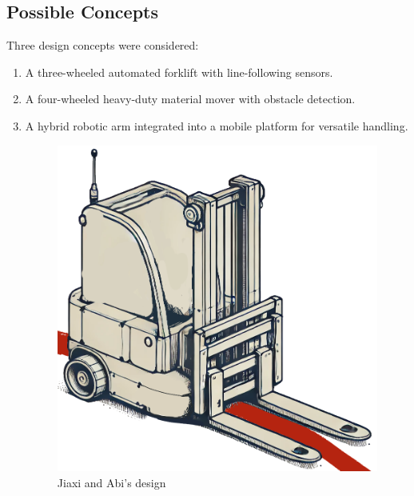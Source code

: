 \documentclass[12pt]{article}
\begin{document}
\subsection{Possible Concepts}
Three design concepts were considered:
\begin{enumerate}
    \item A three-wheeled automated forklift with line-following sensors.
    \item A four-wheeled heavy-duty material mover with obstacle detection.
    \item A hybrid robotic arm integrated into a mobile platform for versatile handling.
 

 \begin{figure}[h!]
    \centering
    \begin{minipage}{0.48\textwidth}
        \centering
        \includegraphics[width=\textwidth]{Simple_sketch_of_an_automated_forklift_robot_with_two_wheels_at_the_back_and_one_wheel_in_the_front.png}
        \caption{Jiaxi and Abi's design}
        \label{fig:three_wheel_line_flowing}
    \end{minipage}
    \hfill
    \begin{minipage}{0.48\textwidth}
        \centering

\end{minipage}
\end{figure}
\end{enumerate}
\end{document}
